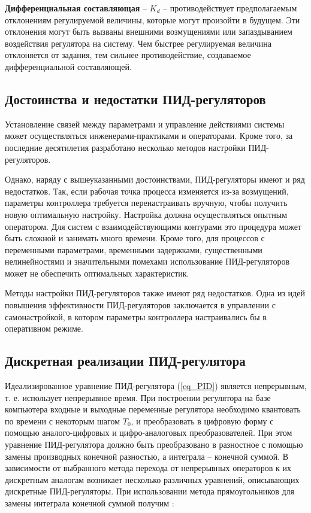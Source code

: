 \textbf{Дифференциальная составляющая} – $K_d$ – противодействует предполагаемым отклонениям регулируемой величины, которые могут произойти в будущем. Эти отклонения могут быть вызваны внешними возмущениями или запаздыванием воздействия регулятора на систему. Чем быстрее регулируемая величина отклоняется от задания, тем сильнее противодействие, создаваемое дифференциальной составляющей.

\subsection{Достоинства и недостатки ПИД-регуляторов}

Установление связей между параметрами и управление действиями системы может осуществляться инженерами-практиками и операторами.
Кроме того, за последние десятилетия разработано несколько методов настройки ПИД-регуляторов.

Однако, наряду с вышеуказанными достоинствами, ПИД-регуляторы имеют и ряд недостатков. Так, если рабочая точка процесса изменяется из-за возмущений, параметры контроллера требуется перенастраивать вручную, чтобы получить новую оптимальную настройку. Настройка должна осуществляться опытным оператором. Для систем с взаимодействующими контурами это процедура может быть сложной и занимать много времени. Кроме того, для процессов с переменными параметрами, временными задержками, существенными нелинейностями и значительными помехами использование ПИД-регуляторов может не обеспечить оптимальных характеристик.

Методы настройки ПИД-регуляторов также имеют ряд недостатков.
Одна из идей повышения эффективности ПИД-регуляторов заключается в управлении с самонастройкой, в котором параметры контроллера настраивались бы в оперативном режиме.

\subsection{Дискретная реализации ПИД-регулятора}

Идеализированное уравнение ПИД-регулятора (\ref{eq_PID}) является непрерывным, т. е. использует непрерывное время. При построении регулятора на базе компьютера входные и выходные переменные регулятора необходимо квантовать по времени с некоторым шагом $T_0$, и преобразовать в цифровую форму с помощью аналого-цифровых и цифро-аналоговых преобразователей. При этом уравнение ПИД-регулятора должно быть преобразовано в разностное с помощью замены производных конечной разностью, а интеграла – конечной суммой. В зависимости от выбранного метода перехода от непрерывных операторов к их дискретным аналогам возникает несколько различных уравнений, описывающих дискретные ПИД-регуляторы. При использовании метода прямоугольников для замены интеграла конечной суммой получим \cite{PID_NIL_AP}:



